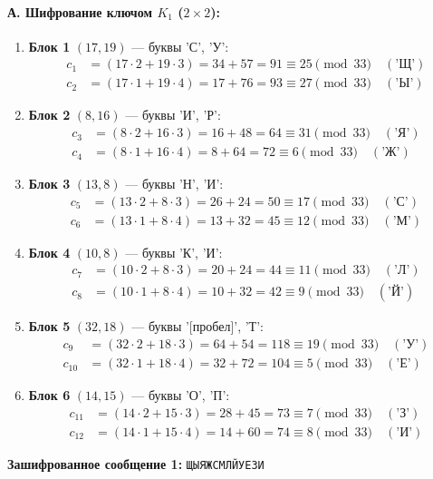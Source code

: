 \paragraph{А. Шифрование ключом $K_1$ ($2\times2$):}
\begin{enumerate}
    \item \textbf{Блок 1} $(17, 19)$ — буквы 'С', 'У':
    \[
    \begin{aligned}
        c_1 &= (17 \cdot 2 + 19 \cdot 3) = 34 + 57 = 91 \equiv 25 \pmod{33} \quad (\text{'Щ'}) \\
        c_2 &= (17 \cdot 1 + 19 \cdot 4) = 17 + 76 = 93 \equiv 27 \pmod{33} \quad (\text{'Ы'})
    \end{aligned}
    \]
    \item \textbf{Блок 2} $(8, 16)$ — буквы 'И', 'Р':
    \[
    \begin{aligned}
        c_3 &= (8 \cdot 2 + 16 \cdot 3) = 16 + 48 = 64 \equiv 31 \pmod{33} \quad (\text{'Я'}) \\
        c_4 &= (8 \cdot 1 + 16 \cdot 4) = 8 + 64 = 72 \equiv 6 \pmod{33} \quad (\text{'Ж'})
    \end{aligned}
    \]
    \item \textbf{Блок 3} $(13, 8)$ — буквы 'Н', 'И':
    \[
    \begin{aligned}
        c_5 &= (13 \cdot 2 + 8 \cdot 3) = 26 + 24 = 50 \equiv 17 \pmod{33} \quad (\text{'С'}) \\
        c_6 &= (13 \cdot 1 + 8 \cdot 4) = 13 + 32 = 45 \equiv 12 \pmod{33} \quad (\text{'М'})
    \end{aligned}
    \]
    \item \textbf{Блок 4} $(10, 8)$ — буквы 'К', 'И':
    \[
    \begin{aligned}
        c_7 &= (10 \cdot 2 + 8 \cdot 3) = 20 + 24 = 44 \equiv 11 \pmod{33} \quad (\text{'Л'}) \\
        c_8 &= (10 \cdot 1 + 8 \cdot 4) = 10 + 32 = 42 \equiv 9 \pmod{33} \quad (\text{'Й'})
    \end{aligned}
    \]
    \item \textbf{Блок 5} $(32, 18)$ — буквы '[пробел]', 'Т':
    \[
    \begin{aligned}
        c_9 &= (32 \cdot 2 + 18 \cdot 3) = 64 + 54 = 118 \equiv 19 \pmod{33} \quad (\text{'У'}) \\
        c_{10} &= (32 \cdot 1 + 18 \cdot 4) = 32 + 72 = 104 \equiv 5 \pmod{33} \quad (\text{'Е'})
    \end{aligned}
    \]
    \item \textbf{Блок 6} $(14, 15)$ — буквы 'О', 'П':
    \[
    \begin{aligned}
        c_{11} &= (14 \cdot 2 + 15 \cdot 3) = 28 + 45 = 73 \equiv 7 \pmod{33} \quad (\text{'З'}) \\
        c_{12} &= (14 \cdot 1 + 15 \cdot 4) = 14 + 60 = 74 \equiv 8 \pmod{33} \quad (\text{'И'})
    \end{aligned}
    \]
\end{enumerate}
\textbf{Зашифрованное сообщение 1:} \texttt{ЩЫЯЖСМЛЙУЕЗИ}

